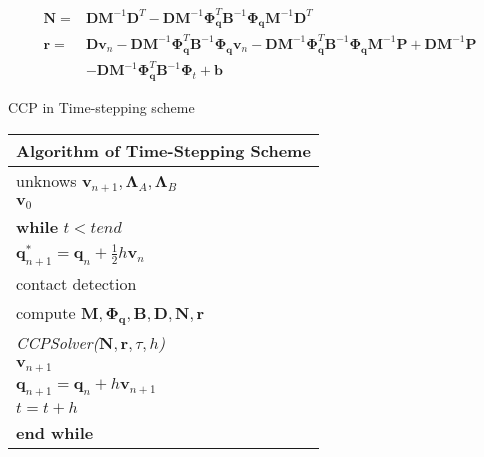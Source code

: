 \documentclass[12pt]{article}
\begin{document}
        \begin{equation}
            \begin{aligned}
                \mathbf{N}=&\mathbf{D}\mathbf{M}^{-1}\mathbf{D}^T
                -\mathbf{D}\mathbf{M}^{-1}\boldsymbol{\Phi}_{\mathbf{q}}^T\mathbf{B}^{-1}\boldsymbol{\Phi}_{\mathbf{q}}\mathbf{M}^{-1}\mathbf{D}^T\\
                \mathbf{r}=&\mathbf{D}\mathbf{v}_n-\mathbf{D}\mathbf{M}^{-1}\boldsymbol{\Phi}_{\mathbf{q}}^T
                \mathbf{B}^{-1}\boldsymbol{\Phi}_{\mathbf{q}}\mathbf{v}_n
                -\mathbf{D}\mathbf{M}^{-1}\boldsymbol{\Phi}_{\mathbf{q}}^T\mathbf{B}^{-1}\boldsymbol{\Phi}_{\mathbf{q}}\mathbf{M}^{-1}\mathbf{P}
                +\mathbf{D}\mathbf{M}^{-1}\mathbf{P}\\
                &-\mathbf{D}\mathbf{M}^{-1}\boldsymbol{\Phi}_{\mathbf{q}}^T\mathbf{B}^{-1}\boldsymbol{\Phi}_t
                +\mathbf{b}
            \end{aligned}
        \end{equation}
        \newpage

        \noindent CCP in Time-stepping scheme
        \begin{center}
            \begin{tabularx}{\textwidth}{|X|}
                \hline
                \textbf{Algorithm of Time-Stepping Scheme}\\
                \hline
                unknows $\mathbf{v}_{n+1},\boldsymbol{\Lambda}_A,\boldsymbol{\Lambda}_B$\\
                $\mathbf{v}_0$\\
                \textbf{while} $t<tend$\\
                \qquad $\mathbf{q}_{n+1}^*=\mathbf{q}_{n}+\frac{1}{2}h\mathbf{v}_n$\\
                \qquad contact detection\\
                \qquad compute $\mathbf{M},\boldsymbol{\Phi}_{\mathbf{q}},\mathbf{B},\mathbf{D},\mathbf{N},\mathbf{r}$\\
                \qquad \textit{CCPSolver(}$\mathbf{N},\mathbf{r},\tau,h$\textit{)}\\
                \qquad $\mathbf{v}_{n+1}$\\
                \qquad $\mathbf{q}_{n+1}=\mathbf{q}_n+h\mathbf{v}_{n+1}$\\
                \qquad $t=t+h$\\
                \textbf{end while}\\
                \hline
            \end{tabularx}
        \end{center}

    
\end{document}
